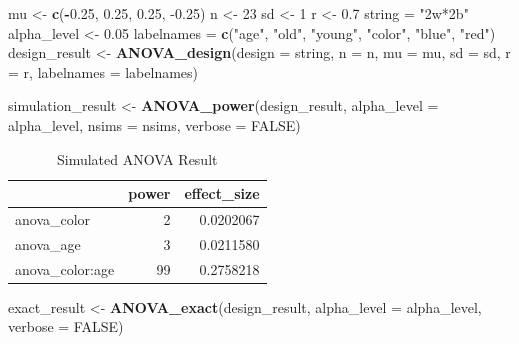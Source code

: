 \documentclass[]{book}
\newenvironment{Shaded}{\begin{snugshade}}{\end{snugshade}}
\newcommand{\DataTypeTok}[1]{\textcolor[rgb]{0.13,0.29,0.53}{#1}}
\newcommand{\DecValTok}[1]{\textcolor[rgb]{0.00,0.00,0.81}{#1}}
\newcommand{\FloatTok}[1]{\textcolor[rgb]{0.00,0.00,0.81}{#1}}
\newcommand{\KeywordTok}[1]{\textcolor[rgb]{0.13,0.29,0.53}{\textbf{#1}}}
\newcommand{\NormalTok}[1]{#1}
\newcommand{\OperatorTok}[1]{\textcolor[rgb]{0.81,0.36,0.00}{\textbf{#1}}}
\newcommand{\OtherTok}[1]{\textcolor[rgb]{0.56,0.35,0.01}{#1}}
\newcommand{\StringTok}[1]{\textcolor[rgb]{0.31,0.60,0.02}{#1}}
\begin{document}
\begin{Shaded}
\begin{Highlighting}[]
\NormalTok{mu <-}\StringTok{ }\KeywordTok{c}\NormalTok{(}\OperatorTok{-}\FloatTok{0.25}\NormalTok{, }\FloatTok{0.25}\NormalTok{, }\FloatTok{0.25}\NormalTok{, }\FloatTok{-0.25}\NormalTok{)}
\NormalTok{n <-}\StringTok{ }\DecValTok{23}
\NormalTok{sd <-}\StringTok{ }\DecValTok{1}
\NormalTok{r <-}\StringTok{ }\FloatTok{0.7}
\NormalTok{string =}\StringTok{ "2w*2b"}
\NormalTok{alpha_level <-}\StringTok{ }\FloatTok{0.05}
\NormalTok{labelnames =}\StringTok{ }\KeywordTok{c}\NormalTok{(}\StringTok{"age"}\NormalTok{, }\StringTok{"old"}\NormalTok{, }\StringTok{"young"}\NormalTok{, }\StringTok{"color"}\NormalTok{, }\StringTok{"blue"}\NormalTok{, }\StringTok{"red"}\NormalTok{)}
\NormalTok{design_result <-}\StringTok{ }\KeywordTok{ANOVA_design}\NormalTok{(}\DataTypeTok{design =}\NormalTok{ string,}
                              \DataTypeTok{n =}\NormalTok{ n, }
                              \DataTypeTok{mu =}\NormalTok{ mu, }
                              \DataTypeTok{sd =}\NormalTok{ sd, }
                              \DataTypeTok{r =}\NormalTok{ r, }
                              \DataTypeTok{labelnames =}\NormalTok{ labelnames)}

\NormalTok{simulation_result <-}\StringTok{ }\KeywordTok{ANOVA_power}\NormalTok{(design_result, }
                                 \DataTypeTok{alpha_level =}\NormalTok{ alpha_level, }
                                 \DataTypeTok{nsims =}\NormalTok{ nsims,}
                                 \DataTypeTok{verbose =} \OtherTok{FALSE}\NormalTok{)}
\end{Highlighting}
\end{Shaded}

\begin{table}[t]

\caption{\label{tab:unnamed-chunk-102}Simulated ANOVA Result}
\centering
\begin{tabular}{l|r|r}
\hline
  & power & effect\_size\\
\hline
anova\_color & 2 & 0.0202067\\
\hline
anova\_age & 3 & 0.0211580\\
\hline
anova\_color:age & 99 & 0.2758218\\
\hline
\end{tabular}
\end{table}

\begin{Shaded}
\begin{Highlighting}[]
\NormalTok{exact_result <-}\StringTok{ }\KeywordTok{ANOVA_exact}\NormalTok{(design_result,}
                            \DataTypeTok{alpha_level =}\NormalTok{ alpha_level,}
                            \DataTypeTok{verbose =} \OtherTok{FALSE}\NormalTok{)}
\end{Highlighting}
\end{Shaded}
\end{document}

